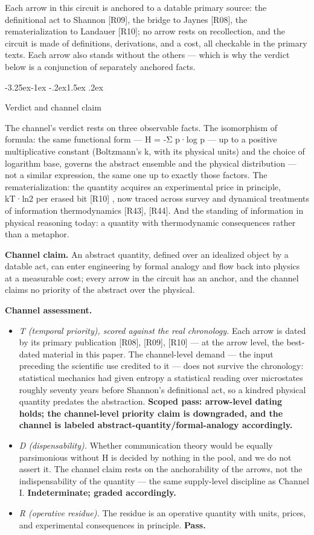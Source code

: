 \documentclass[11pt,a4paper]{article}
\makeatletter
\renewcommand\subsection{\@startsection{subsection}{2}{\z@}%
  {-3.25ex\@plus -1ex \@minus -.2ex}{1.5ex \@plus .2ex}%
  {\normalfont\large\bfseries\raggedright}}
\makeatother
\begin{document}
Each arrow in this circuit is anchored to a datable primary source: the definitional act to Shannon [R09], the bridge to Jaynes [R08], the rematerialization to Landauer [R10]; no arrow rests on recollection, and the circuit is made of definitions, derivations, and a cost, all checkable in the primary texts. Each arrow also stands without the others — which is why the verdict below is a conjunction of separately anchored facts.

\subsection{Verdict and channel claim}

The channel's verdict rests on three observable facts. The isomorphism of formula: the same functional form — H = -Σ p·log p — up to a positive multiplicative constant (Boltzmann's k, with its physical units) and the choice of logarithm base, governs the abstract ensemble and the physical distribution — not a similar expression, the same one up to exactly those factors. The rematerialization: the quantity acquires an experimental price in principle, kT·ln2 per erased bit [R10] , now traced across survey and dynamical treatments of information thermodynamics [R43], [R44]. And the standing of information in physical reasoning today: a quantity with thermodynamic consequences rather than a metaphor.

\textbf{Channel claim.} An abstract quantity, defined over an idealized object by a datable act, can enter engineering by formal analogy and flow back into physics at a measurable cost; every arrow in the circuit has an anchor, and the channel claims no priority of the abstract over the physical.

\textbf{Channel assessment.}

\begin{itemize}[leftmargin=1.6em,itemsep=2pt,parsep=0pt,topsep=3pt]
\item \textit{T (temporal priority), scored against the real chronology.} Each arrow is dated by its primary publication [R08], [R09], [R10] — at the arrow level, the best-dated material in this paper. The channel-level demand — the input preceding the scientific use credited to it — does not survive the chronology: statistical mechanics had given entropy a statistical reading over microstates roughly seventy years before Shannon's definitional act, so a kindred physical quantity predates the abstraction. \textbf{Scoped pass: arrow-level dating holds; the channel-level priority claim is downgraded, and the channel is labeled abstract-quantity/formal-analogy accordingly.}
\item \textit{D (dispensability).} Whether communication theory would be equally parsimonious without H is decided by nothing in the pool, and we do not assert it. The channel claim rests on the anchorability of the arrows, not the indispensability of the quantity — the same supply-level discipline as Channel I. \textbf{Indeterminate; graded accordingly.}
\item \textit{R (operative residue).} The residue is an operative quantity with units, prices, and experimental consequences in principle. \textbf{Pass.}
\end{itemize}
\end{document}
